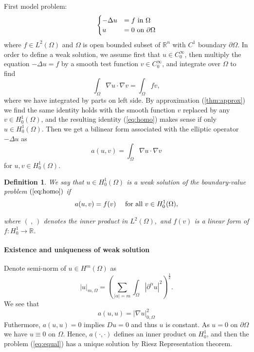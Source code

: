 \documentclass[11pt,letterpaper]{article}
\newtheorem{defn}[thm]{Definition}
\begin{document}
First model problem:
\begin{equation}
  \label{eq:homo}
  \begin{cases}
    -\Delta u&= f\textmd{ in }\Omega\\
    u&=0\textmd{ on }\partial \Omega
  \end{cases}
\end{equation}
where $f\in L^2(\Omega)$ and $\Omega $ is open bounded subset of $\mathbb{R}^n$
with $C^1$ boundary $\partial \Omega$.
In order to define a weak solution,
we assume first that $u\in C^\infty_0$,
then multiply the equation $ -\Delta u= f$
by a smooth test function $v\in C_0^\infty$,
and integrate over $\Omega$ to find
\begin{displaymath}
  \int_\Omega \nabla u\cdot \nabla v=\int _\Omega fv,
\end{displaymath}
where we have integrated by parts on left side.
By approximation (\ref{thm:approx}) we find the same identity holds with the smooth function $v$
replaced by any $v\in H^1_0(\Omega)$,
and the resulting identity (\ref{eq:homo}) makes sense if only $u\in H^1_0(\Omega)$.
Then we get a bilinear form associated with the elliptic operator $-\Delta u$ as
\begin{equation}\label{eq:variation}
  a(u,v)=\int_\Omega \nabla u\cdot \nabla v
\end{equation}
for $u,v\in H^1_0(\Omega)$.
\begin{defn}
  We say that $u\in H_0^1(\Omega)$ is a weak solution of the boundary-value problem $(\ref{eq:homo})$
  if
  \begin{equation}\label{eq:equal}
    a(u,v)=f(v)\quad \textmd{ for all } v\in H^1_0(\Omega),
  \end{equation}
  
  where $(\ ,\ )$ denotes the inner product in $L^2(\Omega),$
  and $f(v)$ is a linear form of $f:H_0^1\rightarrow \mathbb{R}$.
\end{defn}

\paragraph{Existence and uniqueness of weak solution}
Denote semi-norm of $u\in H^m(\Omega)$ as
\begin{displaymath}
  |u|_{m,\Omega}=\left(\sum_{|\alpha|=m} \int_{\Omega}|\partial^\alpha u|^2\right)^{\frac{1}{2}}.
\end{displaymath}
We see that
\begin{displaymath}
  a(u,u)=|\nabla u|_{0,\Omega}^2
\end{displaymath}
Futhermore, $a(u,u)=0$ implies $Du = 0$ and thus $u$ is constant.
As $u=0$ on $\partial \Omega$ we have $u\equiv 0$ on $\Omega.$
Hence, $a(\cdot,\cdot )$ defines an inner product on $H^1_0$,
and then the problem (\ref{eq:equal}) has a unique solution by
Riesz Representation theorem.
\end{document}
